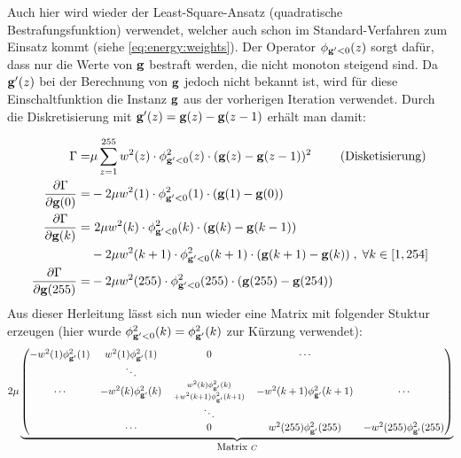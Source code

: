 Auch hier wird wieder der Least-Square-Ansatz (quadratische Bestrafungsfunktion) verwendet, welcher auch schon im Standard-Verfahren zum Einsatz kommt (siehe \autoref{eq:energy:weights}). Der Operator $\phi_{\mathbf g'<0} (z)$ sorgt dafür, dass nur die Werte von $\mathbf g$ bestraft werden, die nicht monoton steigend sind. Da $\mathbf g'(z)$ bei der Berechnung von $\mathbf g$ jedoch nicht bekannt ist, wird für diese Einschaltfunktion die Instanz $\mathbf g$ aus der vorherigen Iteration verwendet. Durch die Diskretisierung mit $\mathbf g'(z) = \mathbf g(z)-\mathbf g(z-1)$ erhält man damit:

\begin{align}
\Gamma = & \mu \sum_{z=1}^{255} w^2(z) \cdot \phi^2_{\mathbf g'<0}(z) \cdot (\mathbf g(z)- \mathbf g(z-1))^2 \qquad \mbox{ (Disketisierung)}\\
\label{eq:mon:diskret}
\frac{\partial \Gamma}{\partial \mathbf g(0)} =& -2\mu w^2(1) \cdot \phi^2_{\mathbf g'<0}(1)\cdot(\mathbf g(1)-\mathbf g(0))\\\frac{\partial \Gamma}{\partial \mathbf g(k)} 
        = &~ 2\mu w^2(k) \cdot \phi^2_{\mathbf g'<0}(k)\cdot(\mathbf g(k)-\mathbf g(k-1)) \nonumber \\
         &- 2 \mu w^2(k+1) \cdot \phi^2_{\mathbf g'<0}(k+1)\cdot(\mathbf g(k+1)-\mathbf g(k))
        \; , \; \forall k \in [1,254]\\
\frac{\partial \Gamma}{\partial \mathbf g(255)} =& -2\mu w^2(255) \cdot \phi^2_{\mathbf g'<0}(255)\cdot(\mathbf g(255)-\mathbf g(254))
\end{align}
Aus dieser Herleitung lässt sich nun wieder eine Matrix mit folgender Stuktur erzeugen (hier wurde $\phi^2_{\mathbf g'<0}(k) = \phi^2_{\mathbf g'}(k)$ zur Kürzung verwendet):
\small
\begin{align}
2\mu 
\underbrace{\begin{pmatrix}
-w^2(1)\phi^2_{\mathbf g'}(1) &w^2(1)\phi^2_{\mathbf g'}(1) & 0 & \cdots\\
& \ddots\\
\cdots & -w^2(k)\phi^2_{\mathbf g'}(k) & 
\begin{smallmatrix}
w^2(k)\phi^2_{\mathbf g'}(k) \\+ w^2(k+1)\phi^2_{\mathbf g'}(k+1)
\end{smallmatrix}
 & -w^2(k+1)\phi^2_{\mathbf g'}(k+1) & \cdots \\
& & \ddots\\
& \cdots &  0 & w^2(255)\phi^2_{\mathbf g'}(255) & - w^2(255)\phi^2_{\mathbf g'}(255) \\
\end{pmatrix}}_{\mbox{Matrix } C}
\end{align}
\normalsize

